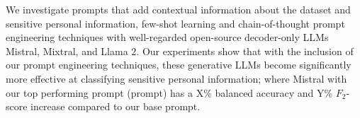 We investigate prompts that add contextual information about the dataset and sensitive personal information, few-shot learning and chain-of-thought prompt engineering techniques with well-regarded open-source decoder-only LLMs Mistral, Mixtral, and Llama 2. Our experiments show that with the inclusion of our prompt engineering techniques, these generative LLMs become significantly more effective at classifying sensitive personal information; where Mistral with our top performing prompt (prompt) has a X\% balanced accuracy and Y\% $F_2$-score increase compared to our base prompt.

